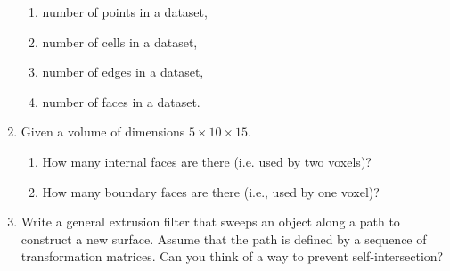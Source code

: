 \begin{enumerate}
\begin{enumerate}
    \item number of points in a dataset,

    \item number of cells in a dataset,

    \item number of edges in a dataset,

    \item number of faces in a dataset.

    \end{enumerate}

\item Given a volume of dimensions $5 \times 10 \times 15$.
    \begin{enumerate}

    \item How many internal faces are there (i.e. used by two voxels)?

    \item How many boundary faces are there (i.e., used by one voxel)?

    \end{enumerate}

\item Write a general extrusion filter that sweeps an object along a path to construct a new surface. Assume that the path is defined by a sequence of transformation matrices. Can you think of a way to prevent self-intersection?

\end{enumerate}

